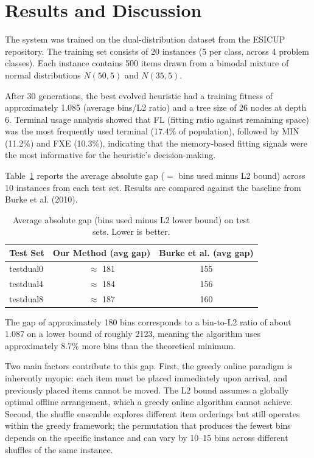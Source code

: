 \documentclass[conference]{IEEEtran}
\begin{document}

\section{Results and Discussion}

The system was trained on the dual-distribution dataset from the ESICUP repository. The training set consists of 20 instances (5 per class, across 4 problem classes). Each instance contains 500 items drawn from a bimodal mixture of normal distributions $N(50, 5)$ and $N(35, 5)$.

After 30 generations, the best evolved heuristic had a training fitness of approximately 1.085 (average bins/L2 ratio) and a tree size of 26 nodes at depth 6. Terminal usage analysis showed that FL (fitting ratio against remaining space) was the most frequently used terminal (17.4\% of population), followed by MIN (11.2\%) and FXE (10.3\%), indicating that the memory-based fitting signals were the most informative for the heuristic's decision-making.

Table~\ref{tab:results} reports the average absolute gap ($=$ bins used minus L2 bound) across 10 instances from each test set. Results are compared against the baseline from Burke et al. (2010).

\begin{table}[h]
\centering
\caption{Average absolute gap (bins used minus L2 lower bound) on test sets. Lower is better.}
\label{tab:results}
\begin{tabular}{lcc}
\hline
\textbf{Test Set} & \textbf{Our Method (avg gap)} & \textbf{Burke et al. (avg gap)} \\ \hline
testdual0 & $\approx$ 181 & 155 \\
testdual4 & $\approx$ 184 & 156 \\
testdual8 & $\approx$ 187 & 160 \\ \hline
\end{tabular}
\end{table}

The gap of approximately 180 bins corresponds to a bin-to-L2 ratio of about 1.087 on a lower bound of roughly 2123, meaning the algorithm uses approximately 8.7\% more bins than the theoretical minimum.

Two main factors contribute to this gap. First, the greedy online paradigm is inherently myopic: each item must be placed immediately upon arrival, and previously placed items cannot be moved. The L2 bound assumes a globally optimal offline arrangement, which a greedy online algorithm cannot achieve. Second, the shuffle ensemble explores different item orderings but still operates within the greedy framework; the permutation that produces the fewest bins depends on the specific instance and can vary by 10--15 bins across different shuffles of the same instance.
\end{document}
